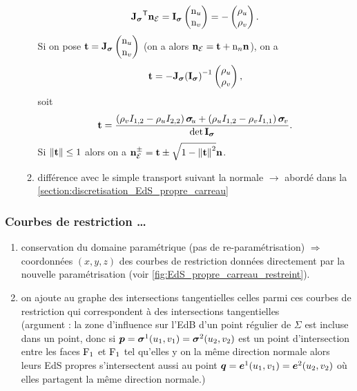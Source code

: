 \begin{enumerate}
\begin{enumerate}
		\[
			{\mathbf{J}_{\bm{\sigma}}} ^\mathsf{T} \mathbf{n}_{\mathcal{E}} = \mathbf{I}_{\bm{\sigma}} \begin{pmatrix} \mathrm{n}_u \\ \mathrm{n}_v \end{pmatrix} = -\begin{pmatrix} \rho_u \\ \rho_v \end{pmatrix}.
		\]
		Si on pose $\mathbf{t} = \mathbf{J}_{\bm{\sigma}} \begin{pmatrix} \mathrm{n}_u \\ \mathrm{n}_v \end{pmatrix}$ (on a alors $\mathbf{n}_{\mathcal{E}} = \mathbf{t} + \mathrm{n}_n \mathbf{n}$), on a
		\[
			\mathbf{t} = - \mathbf{J}_{\bm{\sigma}} { \left(\mathbf{I}_{\bm{\sigma}}\right) } ^{-1} \begin{pmatrix} \rho_u \\ \rho_v \end{pmatrix},
		\]
		soit
		\[
			\mathbf{t} = \frac{
				\left( \rho_v I_{1,2} - \rho_u I_{2,2} \right) \bm{\sigma}_{\mkern-3muu} + 
				\left( \rho_u I_{1,2} - \rho_v I_{1,1} \right) \bm{\sigma}_{\mkern-2muv}
			}{
				\det{\mathbf{I}_{\bm{\sigma}}}
			}.
		\]
		Si $\left\| {\mathbf{t}} \right\| \leq 1$ alors on a $\mathbf{n}_{\mathcal{E}}^{\pm} = \mathbf{t} \pm \sqrt{1 - \left\| {\mathbf{t}} \right\|^2} \mathbf{n}$.
				
		\item différence avec le simple transport suivant la normale $\to$ abordé dans la \autoref{section:discretisation_EdS_propre_carreau}
	\end{enumerate}
\end{enumerate}




\subsubsection{Courbes de restriction \ldots}
\begin{enumerate}
	\item conservation du domaine paramétrique (pas de re-paramétrisation) $\Rightarrow$ coordonnées $(x,y,z)$ des courbes de restriction données directement par la nouvelle paramétrisation (voir \autoref{fig:EdS_propre_carreau_restreint}).
	\item on ajoute au graphe des intersections tangentielles celles parmi ces courbes de restriction qui correspondent à des intersections tangentielles\\
	(argument : la zone d'influence sur l'EdB d'un point régulier de $\Sigma$ est incluse dans un point, donc si $\bm{p} = \bm{\sigma}^1(u_1,v_1) = \bm{\sigma}^2(u_2,v_2)$ est un point d'intersection entre les faces $\mathrm{F}_1$ et $\mathrm{F}_1$ tel qu'elles y on la même direction normale alors leurs EdS propres s'intersectent aussi au point $\bm{q} = \bm{e}^1(u_1,v_1) = \bm{e}^2(u_2,v_2)$ où elles partagent la même direction normale.) 
\end{enumerate}




